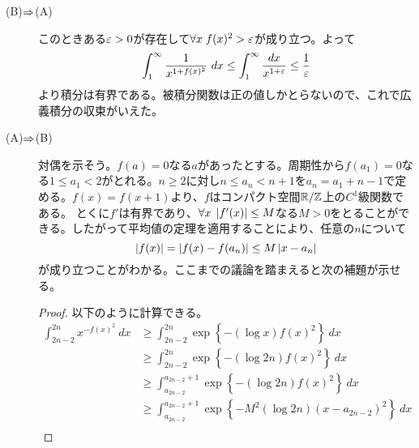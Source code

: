 \subsubsection{}
\begin{sol} ${}$
  \begin{description}
    \item[(B)$\Rightarrow$(A)] このときある${\varepsilon} > 0$が存在して$\forall x \; f(x)^2 > {\varepsilon}$が成り立つ。よって
    \begin{align*}
            \int_1^{\infty} \frac{1}{x^{1+f(x)^2}} \ dx \leq \int_1^{\infty} \frac{dx}{x^{1+{\varepsilon}}}
            \leq \frac{1}{{\varepsilon}}
    \end{align*}
    より積分は有界である。被積分関数は正の値しかとらないので、これで広義積分の収束がいえた。
    \item[(A)$\Rightarrow$(B)] 対偶を示そう。$f(a)=0$なる$a$があったとする。周期性から$f(a_1)=0$なる$1 \leq a_1 < 2$がとれる。$n \geq 2$に対し$ n \leq a_n < n+1$を$a_n = a_1 + n-1$で定める。$f(x)=f(x+1)$より、$f$はコンパクト空間${\mathbb R} / {\mathbb Z}$上の$C^1$級関数である。
    とくに$f'$は有界であり、$\forall x \; \left \lvert f'(x) \right \rvert \leq M$なる$M > 0$をとることができる。したがって平均値の定理を適用することにより、任意の$n$について
    \[
    \left \lvert f(x) \right \rvert = \left \lvert f(x) - f(a_n) \right \rvert \leq M \left \lvert x - a_n \right \rvert
    \]
    が成り立つことがわかる。ここまでの議論を踏まえると次の補題が示せる。
\begin{proof}
  以下のように計算できる。
  \begin{align*}
    \int_{2n-2}^{2n} x^{-f(x)^2} \ dx  &\geq \int_{2n-2}^{2n} \exp \left\{ - (\log x) f(x)^2 \right\} \ dx \\
    &\geq \int_{2n-2}^{2n} \exp \left\{ - (\log 2n) f(x)^2 \right\} \ dx \\
　　&\geq \int_{a_{2n-2}}^{a_{2n-2}+1} \exp \left\{ - (\log 2n) f(x)^2 \right\} \ dx \\
　　&\geq \int_{a_{2n-2}}^{a_{2n-2}+1} \exp \left\{ - M^2(\log 2n) (x-a_{2n-2})^2 \right\} \ dx \\

\end{align*}
\end{proof}
\end{description}
\end{sol}
